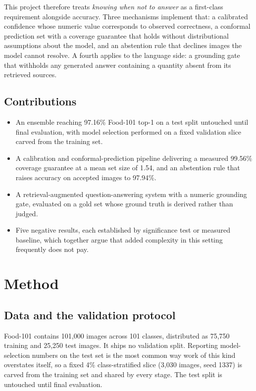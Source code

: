 \documentclass[11pt,a4paper,twoside]{article}
\newcommand{\num}[1]{\mbox{#1}}
\begin{document}
This project therefore treats \emph{knowing when not to answer} as a first-class requirement
alongside accuracy. Three mechanisms implement that: a calibrated confidence whose numeric
value corresponds to observed correctness, a conformal prediction set with a coverage
guarantee that holds without distributional assumptions about the model, and an abstention
rule that declines images the model cannot resolve. A fourth applies to the language side: a
grounding gate that withholds any generated answer containing a quantity absent from its
retrieved sources.

\subsection{Contributions}

\begin{itemize}
  \item An ensemble reaching \num{97.16\%} Food-101 top-1 on a test split untouched until
        final evaluation, with model selection performed on a fixed validation slice carved
        from the training set.
  \item A calibration and conformal-prediction pipeline delivering a measured \num{99.56\%}
        coverage guarantee at a mean set size of \num{1.54}, and an abstention rule that
        raises accuracy on accepted images to \num{97.94\%}.
  \item A retrieval-augmented question-answering system with a numeric grounding gate,
        evaluated on a gold set whose ground truth is derived rather than judged.
  \item Five negative results, each established by significance test or measured baseline,
        which together argue that added complexity in this setting frequently does not pay.
\end{itemize}

\section{Method}

\subsection{Data and the validation protocol}

Food-101 \cite{bossard2014} contains \num{101{,}000} images across 101 classes, distributed
as \num{75{,}750} training and \num{25{,}250} test images. It ships no validation split.
Reporting model-selection numbers on the test set is the most common way work of this kind
overstates itself, so a fixed \num{4\%} class-stratified slice (\num{3{,}030} images, seed
1337) is carved from the training set and shared by every stage. The test split is untouched
until final evaluation.
\end{document}
